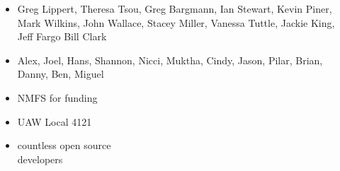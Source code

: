 \documentclass[12pt,mathserif]{beamer}
\newcommand{\SG  }[1]{\color{SG  }{#1 }\color{black}}
\newcommand{\WCVI}[1]{\color{WCVI}{#1 }\color{black}}
\newcommand{\NBC }[1]{\color{NBC }{#1 }\color{black}}
\begin{document}
{\begin{frame}[shrink=20]
{\begin{columns}
\begin{itemize}
      \SG{\item[] Agency folks: WDFW, NMFS, and DFO}
      \begin{itemize}
        \item[] Greg Lippert,
                Theresa Tsou,
                Greg Bargmann,
                Ian Stewart,
                Kevin Piner,
                Mark Wilkins,
                John Wallace,
                Stacey Miller,
                Vanessa Tuttle,
                Jackie King,
                Jeff Fargo
                Bill Clark
      \end{itemize}

      \WCVI{\item[] Shark lab people}
      \begin{itemize}
        \item[] Alex,
                Joel,
                Hans,
                Shannon,
                Nicci,
                Muktha,
                Cindy,
                Jason,
                Pilar,
                Brian,
                Danny,
                Ben,
                Miguel
      \end{itemize}
          \NBC{\item[] Groups}
      \begin{itemize}
        \item[] NMFS for funding
        \item[] UAW Local 4121
        \item[] countless open source \\ developers
      \end{itemize}
    \end{itemize}
    \begin{itemize}


\end{itemize}
\end{columns}}
\end{frame}}
\end{document}
